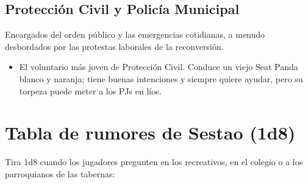 \subsection{Protección Civil y Policía Municipal}
Encargados del orden público y las emergencias cotidianas, a menudo desbordados por las protestas laborales de la reconversión.
\begin{itemize}
  \item {} El voluntario más joven de Protección Civil. Conduce un viejo Seat Panda blanco y naranja; tiene buenas intenciones y siempre quiere ayudar, pero su torpeza puede meter a los PJs en líos.
\end{itemize}

\section{Tabla de rumores de Sestao (1d8)}

Tira 1d8 cuando los jugadores pregunten en los recreativos, en el colegio o a los parroquianos de las tabernas:

